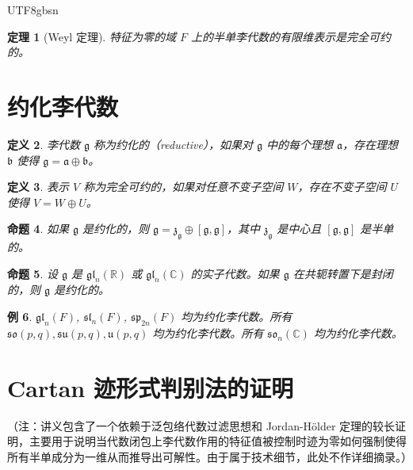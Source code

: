 \documentclass[11pt]{article}
\newtheorem{theorem}{定理}[section]
\newtheorem{proposition}[theorem]{命题}
\newtheorem{definition}[theorem]{定义}
\newtheorem{example}[theorem]{例}
\begin{document}
\begin{CJK*}{UTF8}{gbsn}
\begin{theorem}[Weyl 定理]
特征为零的域 $F$ 上的半单李代数的有限维表示是完全可约的。
\end{theorem}

\section{约化李代数}

\begin{definition}
李代数 $\mathfrak{g}$ 称为约化的（reductive），如果对 $\mathfrak{g}$ 中的每个理想 $\mathfrak{a}$，存在理想 $\mathfrak{b}$ 使得 $\mathfrak{g} = \mathfrak{a} \oplus \mathfrak{b}$。
\end{definition}

\begin{definition}
表示 $V$ 称为完全可约的，如果对任意不变子空间 $W$，存在不变子空间 $U$ 使得 $V = W \oplus U$。
\end{definition}

\begin{proposition}
如果 $\mathfrak{g}$ 是约化的，则 $\mathfrak{g} = \mathfrak{z}_{\mathfrak{g}} \oplus [\mathfrak{g}, \mathfrak{g}]$，其中 $\mathfrak{z}_{\mathfrak{g}}$ 是中心且 $[\mathfrak{g}, \mathfrak{g}]$ 是半单的。
\end{proposition}

\begin{proposition}
设 $\mathfrak{g}$ 是 $\mathfrak{gl}_n(\mathbb{R})$ 或 $\mathfrak{gl}_n(\mathbb{C})$ 的实子代数。如果 $\mathfrak{g}$ 在共轭转置下是封闭的，则 $\mathfrak{g}$ 是约化的。
\end{proposition}

\begin{example}
$\mathfrak{gl}_n(F)$, $\mathfrak{sl}_n(F)$, $\mathfrak{sp}_{2n}(F)$ 均为约化李代数。所有 $\mathfrak{so}(p,q), \mathfrak{su}(p,q), \mathfrak{u}(p,q)$ 均为约化李代数。所有 $\mathfrak{so}_n(\mathbb{C})$ 均为约化李代数。
\end{example}

\section{Cartan 迹形式判别法的证明}
（注：讲义包含了一个依赖于泛包络代数过滤思想和 Jordan-H\"older 定理的较长证明，主要用于说明当代数闭包上李代数作用的特征值被控制时迹为零如何强制使得所有半单成分为一维从而推导出可解性。由于属于技术细节，此处不作详细摘录。）

\end{CJK*}
\end{document}
